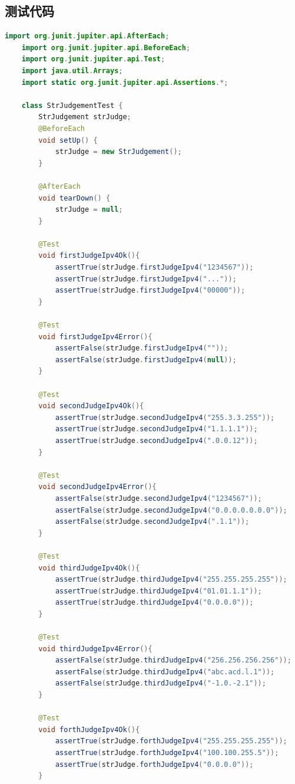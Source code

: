 \documentclass[a4paper]{article}
\begin{document}
\subsection{测试代码}
\begin{lstlisting}[language={java}]
    import org.junit.jupiter.api.AfterEach;
    import org.junit.jupiter.api.BeforeEach;
    import org.junit.jupiter.api.Test;
    import java.util.Arrays;
    import static org.junit.jupiter.api.Assertions.*;
    
    class StrJudgementTest {
        StrJudgement strJudge;
        @BeforeEach
        void setUp() {
            strJudge = new StrJudgement();
        }
    
        @AfterEach
        void tearDown() {
            strJudge = null;
        }
    
        @Test
        void firstJudgeIpv4Ok(){
            assertTrue(strJudge.firstJudgeIpv4("1234567"));
            assertTrue(strJudge.firstJudgeIpv4("..."));
            assertTrue(strJudge.firstJudgeIpv4("00000"));
        }
    
        @Test
        void firstJudgeIpv4Error(){
            assertFalse(strJudge.firstJudgeIpv4(""));
            assertFalse(strJudge.firstJudgeIpv4(null));
        }
    
        @Test
        void secondJudgeIpv4Ok(){
            assertTrue(strJudge.secondJudgeIpv4("255.3.3.255"));
            assertTrue(strJudge.secondJudgeIpv4("1.1.1.1"));
            assertTrue(strJudge.secondJudgeIpv4(".0.0.12"));
        }
    
        @Test
        void secondJudgeIpv4Error(){
            assertFalse(strJudge.secondJudgeIpv4("1234567"));
            assertFalse(strJudge.secondJudgeIpv4("0.0.0.0.0.0.0"));
            assertFalse(strJudge.secondJudgeIpv4(".1.1"));
        }
    
        @Test
        void thirdJudgeIpv4Ok(){
            assertTrue(strJudge.thirdJudgeIpv4("255.255.255.255"));
            assertTrue(strJudge.thirdJudgeIpv4("01.01.1.1"));
            assertTrue(strJudge.thirdJudgeIpv4("0.0.0.0"));
        }
    
        @Test
        void thirdJudgeIpv4Error(){
            assertFalse(strJudge.thirdJudgeIpv4("256.256.256.256"));
            assertFalse(strJudge.thirdJudgeIpv4("abc.acd.l.1"));
            assertFalse(strJudge.thirdJudgeIpv4("-1.0.-2.1"));
        }
    
        @Test
        void forthJudgeIpv4Ok(){
            assertTrue(strJudge.forthJudgeIpv4("255.255.255.255"));
            assertTrue(strJudge.forthJudgeIpv4("100.100.255.5"));
            assertTrue(strJudge.forthJudgeIpv4("0.0.0.0"));
        }
    

\end{lstlisting}
\end{document}
